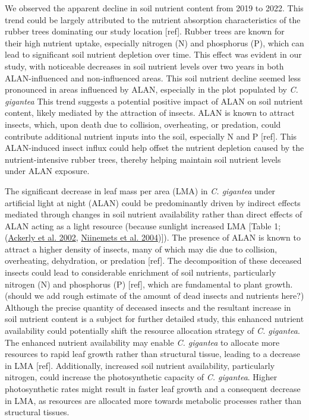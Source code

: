 \documentclass[
  12pt,
  letterpaper,
  DIV=11,
  numbers=noendperiod]{scrartcl}
\begin{document}
We observed the apparent decline in soil nutrient content from 2019 to
2022. This trend could be largely attributed to the nutrient absorption
characteristics of the rubber trees dominating our study location
{[}ref{]}. Rubber trees are known for their high nutrient uptake,
especially nitrogen (N) and phosphorus (P), which can lead to
significant soil nutrient depletion over time. This effect was evident
in our study, with noticeable decreases in soil nutrient levels over two
years in both ALAN-influenced and non-influenced areas. This soil
nutrient decline seemed less pronounced in areas influenced by ALAN,
especially in the plot populated by \emph{C. gigantea} This trend
suggests a potential positive impact of ALAN on soil nutrient content,
likely mediated by the attraction of insects. ALAN is known to attract
insects, which, upon death due to collision, overheating, or predation,
could contribute additional nutrient inputs into the soil, especially N
and P {[}ref{]}. This ALAN-induced insect influx could help offset the
nutrient depletion caused by the nutrient-intensive rubber trees,
thereby helping maintain soil nutrient levels under ALAN exposure.

The significant decrease in leaf mass per area (LMA) in \emph{C.
gigantea} under artificial light at night (ALAN) could be predominantly
driven by indirect effects mediated through changes in soil nutrient
availability rather than direct effects of ALAN acting as a light
resource (because sunlight increased LMA {[}Table 1;
(\protect\hyperlink{ref-Ackerly2002}{Ackerly et al. 2002},
\protect\hyperlink{ref-Niinemets2004}{Niinemets et al. 2004}){]}). The
presence of ALAN is known to attract a higher density of insects, many
of which may die due to collision, overheating, dehydration, or
predation {[}ref{]}. The decomposition of these deceased insects could
lead to considerable enrichment of soil nutrients, particularly nitrogen
(N) and phosphorus (P) {[}ref{]}, which are fundamental to plant growth.
(should we add rough estimate of the amount of dead insects and
nutrients here?) Although the precise quantity of deceased insects and
the resultant increase in soil nutrient content is a subject for further
detailed study, this enhanced nutrient availability could potentially
shift the resource allocation strategy of \emph{C. gigantea}. The
enhanced nutrient availability may enable \emph{C. gigantea} to allocate
more resources to rapid leaf growth rather than structural tissue,
leading to a decrease in LMA {[}ref{]}. Additionally, increased soil
nutrient availability, particularly nitrogen, could increase the
photosynthetic capacity of \emph{C. gigantea}. Higher photosynthetic
rates might result in faster leaf growth and a consequent decrease in
LMA, as resources are allocated more towards metabolic processes rather
than structural tissues.
\end{document}
